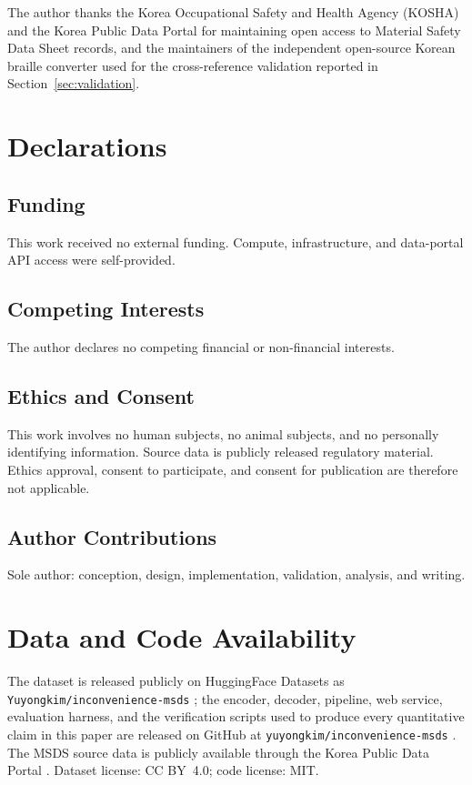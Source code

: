 \documentclass[journal]{IEEEtran}
\begin{document}
The author thanks the Korea Occupational Safety and Health Agency (KOSHA) and the Korea Public Data Portal for maintaining open access to Material Safety Data Sheet records, and the maintainers of the independent open-source Korean braille converter \cite{hangul_braille_converter} used for the cross-reference validation reported in Section~\ref{sec:validation}.

\section*{Declarations}

\subsection*{Funding}
This work received no external funding. Compute, infrastructure, and data-portal API access were self-provided.

\subsection*{Competing Interests}
The author declares no competing financial or non-financial interests.

\subsection*{Ethics and Consent}
This work involves no human subjects, no animal subjects, and no personally identifying information. Source data is publicly released regulatory material. Ethics approval, consent to participate, and consent for publication are therefore not applicable.

\subsection*{Author Contributions}
Sole author: conception, design, implementation, validation, analysis, and writing.

\section*{Data and Code Availability}

The dataset is released publicly on HuggingFace Datasets as \texttt{Yuyongkim/inconvenience-msds} \cite{hf_dataset}; the encoder, decoder, pipeline, web service, evaluation harness, and the verification scripts used to produce every quantitative claim in this paper are released on GitHub at \texttt{yuyongkim/inconvenience-msds} \cite{github_repo}. The MSDS source data is publicly available through the Korea Public Data Portal \cite{data_go_kr}. Dataset license: CC BY~4.0; code license: MIT.
\end{document}
